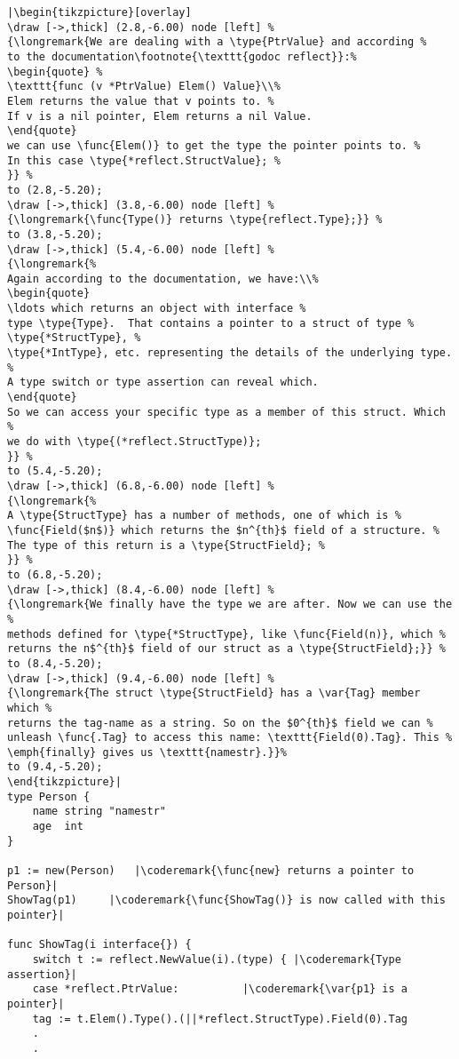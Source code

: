 \begin{lstlisting}[caption=Introspection using reflection,label=src:introspection]
|\begin{tikzpicture}[overlay]
\draw [->,thick] (2.8,-6.00) node [left] %
{\longremark{We are dealing with a \type{PtrValue} and according %
to the documentation\footnote{\texttt{godoc reflect}}:%
\begin{quote} %
\texttt{func (v *PtrValue) Elem() Value}\\%
Elem returns the value that v points to. %
If v is a nil pointer, Elem returns a nil Value. 
\end{quote} 
we can use \func{Elem()} to get the type the pointer points to. %
In this case \type{*reflect.StructValue}; %
}} %
to (2.8,-5.20);
\draw [->,thick] (3.8,-6.00) node [left] %
{\longremark{\func{Type()} returns \type{reflect.Type};}} %
to (3.8,-5.20);
\draw [->,thick] (5.4,-6.00) node [left] %
{\longremark{%
Again according to the documentation, we have:\\%
\begin{quote}
\ldots which returns an object with interface %
type \type{Type}.  That contains a pointer to a struct of type %
\type{*StructType}, %
\type{*IntType}, etc. representing the details of the underlying type. %
A type switch or type assertion can reveal which.
\end{quote}
So we can access your specific type as a member of this struct. Which %
we do with \type{(*reflect.StructType)};
}} %
to (5.4,-5.20);
\draw [->,thick] (6.8,-6.00) node [left] %
{\longremark{%
A \type{StructType} has a number of methods, one of which is %
\func{Field($n$)} which returns the $n^{th}$ field of a structure. %
The type of this return is a \type{StructField}; %
}} %
to (6.8,-5.20);
\draw [->,thick] (8.4,-6.00) node [left] %
{\longremark{We finally have the type we are after. Now we can use the %
methods defined for \type{*StructType}, like \func{Field(n)}, which %
returns the n$^{th}$ field of our struct as a \type{StructField};}} %
to (8.4,-5.20);
\draw [->,thick] (9.4,-6.00) node [left] %
{\longremark{The struct \type{StructField} has a \var{Tag} member which %
returns the tag-name as a string. So on the $0^{th}$ field we can %
unleash \func{.Tag} to access this name: \texttt{Field(0).Tag}. This %
\emph{finally} gives us \texttt{namestr}.}}%
to (9.4,-5.20);
\end{tikzpicture}|
type Person {
    name string "namestr"
    age  int
}

p1 := new(Person)   |\coderemark{\func{new} returns a pointer to Person}|
ShowTag(p1)	    |\coderemark{\func{ShowTag()} is now called with this pointer}|

func ShowTag(i interface{}) {
    switch t := reflect.NewValue(i).(type) { |\coderemark{Type assertion}|
    case *reflect.PtrValue:		     |\coderemark{\var{p1} is a pointer}|
	tag := t.Elem().Type().(||*reflect.StructType).Field(0).Tag
	.
	.
\end{lstlisting}
